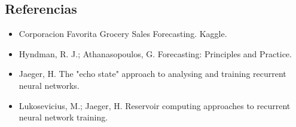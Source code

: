 \documentclass[12pt]{article}
\providecommand{\tightlist}{%
          \setlength{\itemsep}{0pt}\setlength{\parskip}{0pt}}
\begin{document}
\subsection{Referencias}\label{referencias}

\begin{itemize}
\tightlist
\item
  Corporacion Favorita Grocery Sales Forecasting. Kaggle.
\item
  Hyndman, R. J.; Athanasopoulos, G. Forecasting: Principles and Practice.
\item
  Jaeger, H. The "echo state" approach to analysing and training recurrent neural networks.
\item
  Lukosevicius, M.; Jaeger, H. Reservoir computing approaches to recurrent neural network training.
\end{itemize}

        
\end{document}
